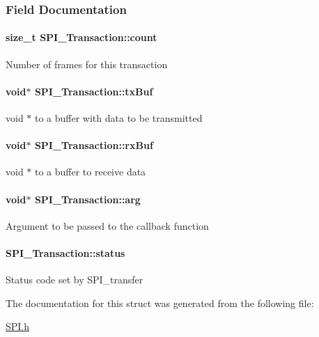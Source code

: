 \subsubsection{Field Documentation}
\paragraph[{count}]{\setlength{\rightskip}{0pt plus 5cm}size\+\_\+t S\+P\+I\+\_\+\+Transaction\+::count}\label{struct_s_p_i___transaction_ad049d6a900c4bdb59a5ee8ce3d5bced2}
Number of frames for this transaction 
\paragraph[{tx\+Buf}]{\setlength{\rightskip}{0pt plus 5cm}void$\ast$ S\+P\+I\+\_\+\+Transaction\+::tx\+Buf}\label{struct_s_p_i___transaction_a9461a248f1cceb4048668d44b323a0b8}
void $\ast$ to a buffer with data to be transmitted 
\paragraph[{rx\+Buf}]{\setlength{\rightskip}{0pt plus 5cm}void$\ast$ S\+P\+I\+\_\+\+Transaction\+::rx\+Buf}\label{struct_s_p_i___transaction_a214f57d7809c875fb9456a62a406e041}
void $\ast$ to a buffer to receive data 
\paragraph[{arg}]{\setlength{\rightskip}{0pt plus 5cm}void$\ast$ S\+P\+I\+\_\+\+Transaction\+::arg}\label{struct_s_p_i___transaction_ac47daaa10705d748ace918a098aa1945}
Argument to be passed to the callback function 
\paragraph[{status}]{ S\+P\+I\+\_\+\+Transaction\+::status}\label{struct_s_p_i___transaction_aa244504b2384411f7de17340be62128a}
Status code set by S\+P\+I\+\_\+transfer 

The documentation for this struct was generated from the following file\+:\begin{DoxyCompactItemize}
\item 
\hyperlink{_s_p_i_8h}{S\+P\+I.\+h}\end{DoxyCompactItemize}
